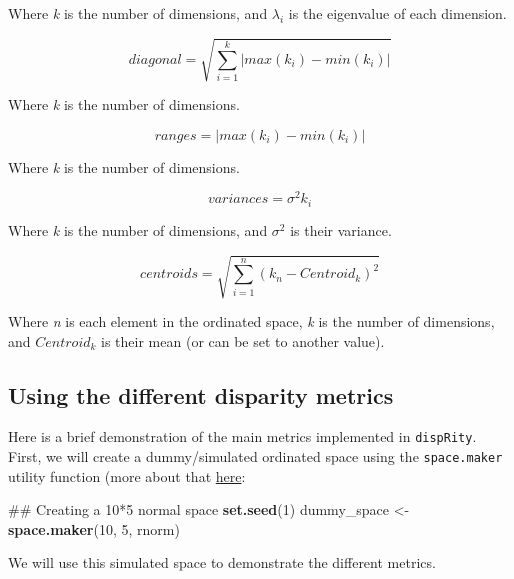 \documentclass[]{book}
\newenvironment{Shaded}{\begin{snugshade}}{\end{snugshade}}
\newcommand{\KeywordTok}[1]{\textcolor[rgb]{0.13,0.29,0.53}{\textbf{#1}}}
\newcommand{\DecValTok}[1]{\textcolor[rgb]{0.00,0.00,0.81}{#1}}
\newcommand{\StringTok}[1]{\textcolor[rgb]{0.31,0.60,0.02}{#1}}
\newcommand{\NormalTok}[1]{#1}
\theoremstyle{definition}
\theoremstyle{definition}
\theoremstyle{remark}
\begin{document}
Where \emph{k} is the number of dimensions, and \(\lambda_i\) is the
eigenvalue of each dimension.

\begin{equation}
    diagonal = \sqrt{\sum_{i=1}^{k}|max(k_i) - min(k_i)|}
\end{equation}

Where \emph{k} is the number of dimensions.

\begin{equation}
    ranges = |max(k_i) - min(k_i)|
\end{equation}

Where \emph{k} is the number of dimensions.

\begin{equation}
    variances = \sigma^{2}{k_i}
\end{equation}

Where \emph{k} is the number of dimensions, and \(\sigma^{2}\) is their
variance.

\begin{equation}
    centroids = \sqrt{\sum_{i=1}^{n}{({k}_{n}-Centroid_{k})^2}}
\end{equation}

Where \emph{n} is each element in the ordinated space, \emph{k} is the
number of dimensions, and \(Centroid_{k}\) is their mean (or can be set
to another value).

\subsection{Using the different disparity
metrics}\label{using-the-different-disparity-metrics}

Here is a brief demonstration of the main metrics implemented in
\texttt{dispRity}. First, we will create a dummy/simulated ordinated
space using the \texttt{space.maker} utility function (more about that
\protect\hyperlink{space.maker}{here}:

\begin{Shaded}
\begin{Highlighting}[]
\NormalTok{## Creating a 10*5 normal space}
\KeywordTok{set.seed}\NormalTok{(}\DecValTok{1}\NormalTok{)}
\NormalTok{dummy_space <-}\StringTok{ }\KeywordTok{space.maker}\NormalTok{(}\DecValTok{10}\NormalTok{, }\DecValTok{5}\NormalTok{, rnorm)}
\end{Highlighting}
\end{Shaded}

We will use this simulated space to demonstrate the different metrics.
\end{document}
